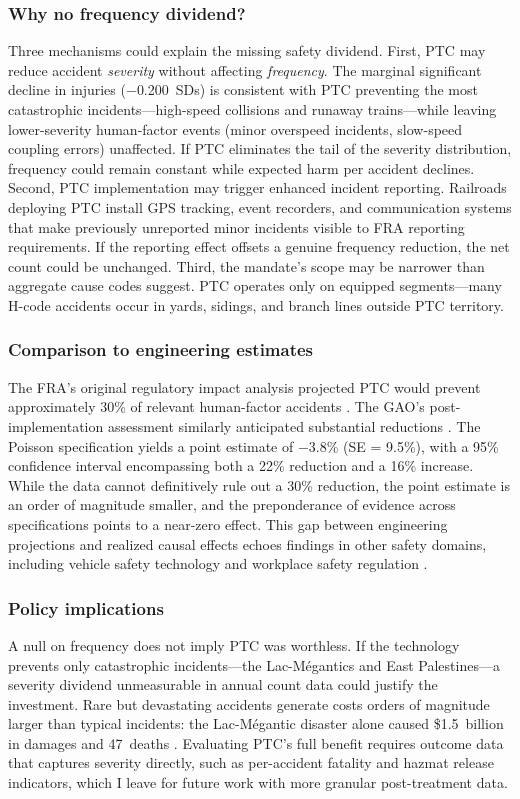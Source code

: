 \documentclass[12pt]{article}
\begin{document}
\subsubsection*{Why no frequency dividend?} Three mechanisms could explain the missing safety dividend. First, PTC may reduce accident \textit{severity} without affecting \textit{frequency}. The marginal significant decline in injuries ($-$0.200~SDs) is consistent with PTC preventing the most catastrophic incidents---high-speed collisions and runaway trains---while leaving lower-severity human-factor events (minor overspeed incidents, slow-speed coupling errors) unaffected. If PTC eliminates the tail of the severity distribution, frequency could remain constant while expected harm per accident declines. Second, PTC implementation may trigger enhanced incident reporting. Railroads deploying PTC install GPS tracking, event recorders, and communication systems that make previously unreported minor incidents visible to FRA reporting requirements. If the reporting effect offsets a genuine frequency reduction, the net count could be unchanged. Third, the mandate's scope may be narrower than aggregate cause codes suggest. PTC operates only on equipped segments---many H-code accidents occur in yards, sidings, and branch lines outside PTC territory.

\subsubsection*{Comparison to engineering estimates} The FRA's original regulatory impact analysis projected PTC would prevent approximately 30\% of relevant human-factor accidents \citep{FRA2010PTC}. The GAO's post-implementation assessment similarly anticipated substantial reductions \citep{GAO2020PTC}. The Poisson specification yields a point estimate of $-$3.8\% (SE = 9.5\%), with a 95\% confidence interval encompassing both a 22\% reduction and a 16\% increase. While the data cannot definitively rule out a 30\% reduction, the point estimate is an order of magnitude smaller, and the preponderance of evidence across specifications points to a near-zero effect. This gap between engineering projections and realized causal effects echoes findings in other safety domains, including vehicle safety technology \citep{Peltzman1975Effects} and workplace safety regulation \citep{Viscusi1979}.

\subsubsection*{Policy implications} A null on frequency does not imply PTC was worthless. If the technology prevents only catastrophic incidents---the Lac-M\'{e}gantics and East Palestines---a severity dividend unmeasurable in annual count data could justify the investment. Rare but devastating accidents generate costs orders of magnitude larger than typical incidents: the Lac-M\'{e}gantic disaster alone caused \$1.5~billion in damages and 47~deaths \citep{TSB2014}. Evaluating PTC's full benefit requires outcome data that captures severity directly, such as per-accident fatality and hazmat release indicators, which I leave for future work with more granular post-treatment data.
\end{document}
